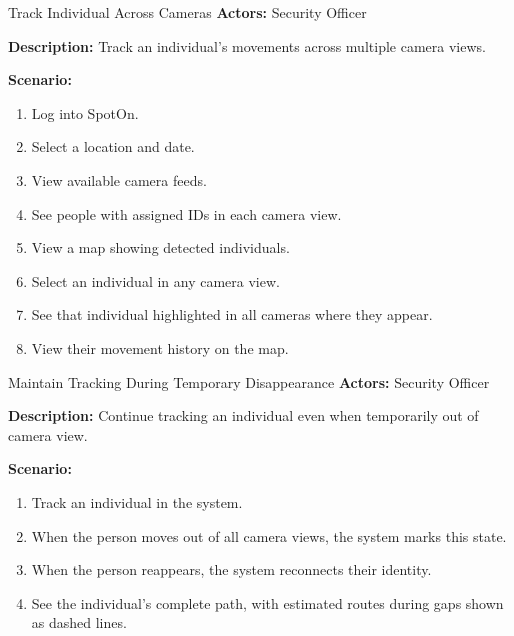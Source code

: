 \begin{usecase}{Track Individual Across Cameras}
    \textbf{Actors:} Security Officer
    
    \textbf{Description:} Track an individual's movements across multiple camera views.
    
    \textbf{Scenario:}
    \begin{enumerate}[leftmargin=80pt]
        \item Log into SpotOn.
        \item Select a location and date.
        \item View available camera feeds.
        \item See people with assigned IDs in each camera view.
        \item View a map showing detected individuals.
        \item Select an individual in any camera view.
        \item See that individual highlighted in all cameras where they appear.
        \item View their movement history on the map.
    \end{enumerate}
\end{usecase}

\begin{usecase}{Maintain Tracking During Temporary Disappearance}
    \textbf{Actors:} Security Officer
    
    \textbf{Description:} Continue tracking an individual even when temporarily out of camera view.
    
    \textbf{Scenario:}
    \begin{enumerate}[leftmargin=80pt]
        \item Track an individual in the system.
        \item When the person moves out of all camera views, the system marks this state.
        \item When the person reappears, the system reconnects their identity.
        \item See the individual's complete path, with estimated routes during gaps shown as dashed lines.
    \end{enumerate}
\end{usecase}

